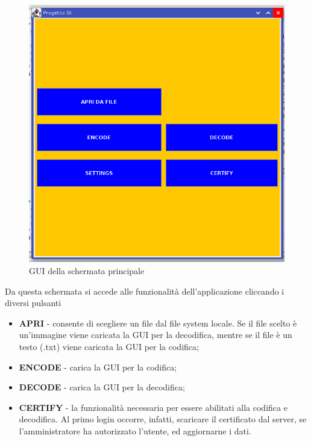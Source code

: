 	\begin{center}	
		\begin{figure}[H]
		\centering
		\includegraphics[scale=0.7]{Immagini/homelayout}
		\caption[homelayout]{GUI della schermata principale}
		\label{fig:home}
		\end{figure}
	\end{center}
	
Da questa schermata si accede alle funzionalità dell'applicazione cliccando i diversi pulsanti
\begin{itemize}
	\item \textbf{APRI} - consente di scegliere un file dal file system locale. Se il file scelto è un'immagine viene caricata la GUI per la decodifica, mentre se il file è un testo (.txt) viene caricata la GUI per la codifica;
	\item \textbf{ENCODE} - carica la GUI per la codifica;
	\item \textbf{DECODE} - carica la GUI per la decodifica;
	\item \textbf{CERTIFY} - la funzionalità necessaria per essere abilitati alla codifica e decodifica. Al primo login occorre, infatti, scaricare il certificato dal server, se l'amministratore ha autorizzato l'utente, ed aggiornarne i dati. 
\end{itemize}

